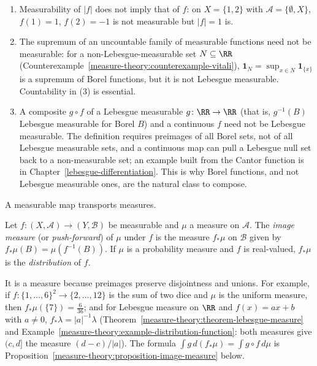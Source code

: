 \begin{counterexample}\label{measure-theory:counterexample-measurable-functions}
\begin{enumerate}
\item Measurability of $|f|$ does not imply that of $f$: on $X = \{1, 2\}$ with $\mathcal{A} = \{\emptyset, X\}$, $f(1) = 1$, $f(2) = -1$ is not measurable but $|f| = 1$ is.
\item The supremum of an uncountable family of measurable functions need not be measurable: for a non-Lebesgue-measurable set $N \subseteq \RR$ (Counterexample~\ref{measure-theory:counterexample-vitali}),
$\mathbf{1}_N = \sup_{x \in N}\mathbf{1}_{\{x\}}$ is a supremum of Borel functions, but it is not Lebesgue measurable. Countability in (3) is essential.
\item A composite $g \circ f$ of a Lebesgue measurable $g \colon \RR \to \RR$ (that is, $g^{-1}(B)$ Lebesgue measurable for Borel $B$) and a continuous $f$ need not be Lebesgue measurable. The
definition requires preimages of all Borel sets, not of all Lebesgue measurable sets, and a continuous map can pull a Lebesgue null set back to a non-measurable set; an example built from the Cantor
function is in Chapter~\ref{lebesgue-differentiation}. This is why Borel functions, and not Lebesgue measurable ones, are the natural class to compose.
\end{enumerate}
\end{counterexample}

A measurable map transports measures.

\begin{definition}\label{measure-theory:definition-image-measure}
Let $f \colon (X, \mathcal{A}) \to (Y, \mathcal{B})$ be measurable and $\mu$ a measure on $\mathcal{A}$. The \emph{image measure} (or \emph{push-forward}) of $\mu$ under $f$ is the measure
$f_*\mu$ on $\mathcal{B}$ given by $f_*\mu(B) = \mu(f^{-1}(B))$. If $\mu$ is a probability measure and $f$ is real-valued, $f_*\mu$ is the \emph{distribution} of $f$.
\end{definition}

It is a measure because preimages preserve disjointness and unions. For example, if $f \colon \{1, \ldots, 6\}^2 \to \{2, \ldots, 12\}$ is the sum of two dice and $\mu$ is the uniform measure, then
$f_*\mu(\{7\}) = \frac{6}{36}$; and for Lebesgue measure on $\RR$ and $f(x) = ax + b$ with $a \neq 0$, $f_*\lambda = |a|^{-1}\lambda$ (Theorem~\ref{measure-theory:theorem-lebesgue-measure} and
Example~\ref{measure-theory:example-distribution-function}: both measures give $(c, d]$ the measure $(d - c)/|a|$). The formula $\int g\,d(f_*\mu) = \int g \circ f\,d\mu$ is
Proposition~\ref{measure-theory:proposition-image-measure} below.

